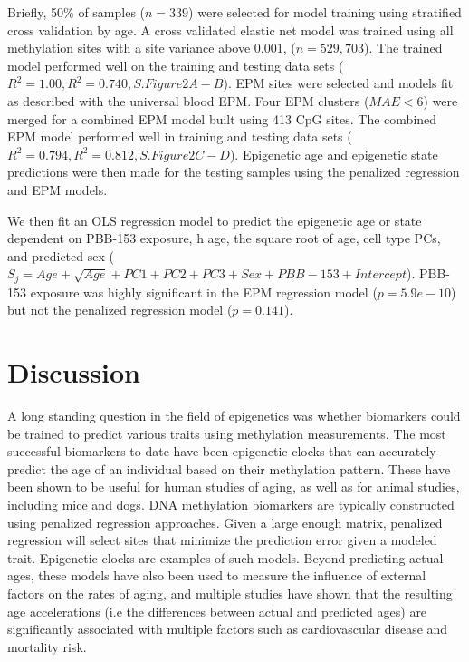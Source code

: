 \documentclass{article}
\begin{document}
{{\begin{linenumbers}
Briefly, 50\% of samples ($n=339$) were selected for model training using stratified cross validation by age. A 
cross validated elastic net model was trained using all methylation sites with a site variance above 0.001, 
($n=529,703$). The trained model performed well on the training and testing data sets 
($R^2 = 1.00, R^2 = 0.740, S.Figure 2 A-B$). EPM sites were selected and models fit as described with the universal 
blood EPM. Four EPM clusters ($MAE < 6$) were merged for a combined EPM model built using 413 CpG sites. The 
combined EPM model performed well in training and testing data sets ($R^2 = 0.794, R^2 = 0.812, S.Figure 2 C-D$). 
Epigenetic age and epigenetic state predictions were then made for the testing samples using the penalized 
regression and EPM models. 

We then fit an OLS regression model to predict the epigenetic age or state dependent on  PBB-153 exposure, h age, the 
square root of age, cell type PCs, and predicted sex 
($S_j  = Age + \sqrt{Age} + PC1 + PC2 + PC3 + Sex + PBB-153 + Intercept$). PBB-153 exposure was highly significant in 
the EPM regression model ($p=5.9e-10$) but not the penalized regression model ($p=0.141$). 

\section{Discussion}

A long standing question in the field of epigenetics was whether biomarkers could be trained to predict various 
traits using methylation measurements.  The most successful biomarkers to date have been epigenetic clocks that can 
accurately predict the age of an individual based on their methylation pattern. These have been shown to be useful for 
human studies of aging, as well as for animal studies, including mice\cite{Thompson2018-rh} and dogs\cite{Thompson2017-cl}.  
DNA methylation biomarkers are typically constructed using penalized regression approaches.  Given a large enough matrix, 
penalized regression will select sites that minimize the prediction error given a modeled trait. Epigenetic clocks 
are examples of such models.  Beyond predicting actual ages, these models have also been used to measure the influence 
of external factors on the rates of aging, and multiple studies have shown that the resulting age accelerations 
(i.e the differences between actual and predicted ages) are significantly associated with multiple factors such as 
cardiovascular disease\cite{Huang2019-hf} and mortality risk\cite{Marioni2015-sn,Perna2016-pi}.


\end{linenumbers}}}
\end{document}
